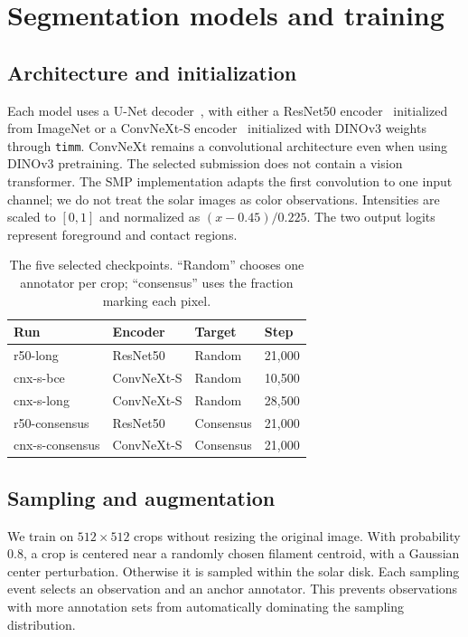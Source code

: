 \documentclass[sigconf,nonacm]{acmart}
\begin{document}
\clearpage
\section{Segmentation models and training}
\subsection{Architecture and initialization}
Each model uses a U-Net decoder~\cite{unet}, with either a ResNet50
encoder~\cite{resnet} initialized from ImageNet or a ConvNeXt-S
encoder~\cite{convnext} initialized with DINOv3 weights~\cite{dinov3} through
\texttt{timm}. ConvNeXt remains a convolutional architecture even when using
DINOv3 pretraining. The selected submission does not contain a vision
transformer. The SMP implementation adapts the first convolution to one
input channel; we do not treat the solar images as color observations.
Intensities are scaled to $[0,1]$ and normalized as $(x-0.45)/0.225$.
The two output logits represent foreground and contact regions.

\begin{table}[h]
\caption{The five selected checkpoints. ``Random'' chooses one annotator
per crop; ``consensus'' uses the fraction marking each pixel.}
\centering\small
\begin{tabular}{llll}
\toprule
Run & Encoder & Target & Step\\
\midrule
r50-long & ResNet50 & Random & 21,000\\
cnx-s-bce & ConvNeXt-S & Random & 10,500\\
cnx-s-long & ConvNeXt-S & Random & 28,500\\
r50-consensus & ResNet50 & Consensus & 21,000\\
cnx-s-consensus & ConvNeXt-S & Consensus & 21,000\\
\bottomrule
\end{tabular}
\end{table}

\subsection{Sampling and augmentation}
We train on $512\times512$ crops without resizing the original image.
With probability 0.8, a crop is centered near a randomly chosen filament
centroid, with a Gaussian center perturbation. Otherwise it is sampled
within the solar disk. Each sampling event selects an observation and
an anchor annotator. This prevents observations with more annotation sets
from automatically dominating the sampling distribution.
\end{document}
